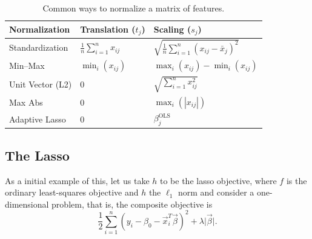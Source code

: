 \begin{table}[hbt]
  \centering
  \caption{Common ways to normalize a matrix of features.}
  \label{tab:normalization-types}
  \begin{tabular}{lll}
    \toprule
    Normalization    & Translation (\(t_j\))              & Scaling (\(s_j\))                                         \\
    \midrule
    Standardization  & \(\frac{1}{n}\sum_{i=1}^n x_{ij}\) & \(\sqrt{\frac{1}{n}\sum_{i=1}^n (x_{ij} - \bar{x}_j)^2}\) \\
    \addlinespace
    Min--Max         & \(\min_i(x_{ij})\)                 & \(\max_i(x_{ij}) - \min_i(x_{ij})\)                       \\
    \addlinespace
    Unit Vector (L2) & 0                                  & \(\sqrt{\sum_{i=1}^n x_{ij}^2}\)                          \\
    \addlinespace
    Max Abs          & 0                                  & \(\max_i(|x_{ij}|)\)                                      \\
    \addlinespace
    Adaptive Lasso   & 0                                  & \(\beta_j^\text{OLS}\)                                    \\
    \bottomrule
  \end{tabular}
\end{table}

\subsection{The Lasso}

As a initial example of this, let us take \(h\) to be the lasso objective, where \(f\) is the ordinary least-squares objective and \(h\) the \(\ell_1\) norm and consider a one-dimensional problem, that is, the composite objective is
\[
  \frac{1}{2} \sum_{i=1}^n(y_i - \beta_0 - \vec{x}^T_i \vec\beta)^2 + \lambda \lvert \vec\beta \rvert.
\]

